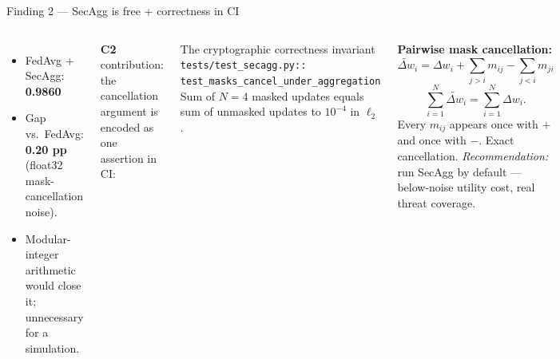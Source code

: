 \documentclass[10pt,aspectratio=169]{beamer}
\begin{document}
\begin{frame}[fragile]{Finding 2 --- SecAgg is free + correctness in CI}
  \begin{columns}[T]
    \begin{itemize}
      \item FedAvg + SecAgg: \textbf{0.9860}
      \item Gap vs.\ FedAvg: \textbf{0.20 pp} (float32 mask-cancellation noise).
      \item Modular-integer arithmetic would close it; unnecessary for a simulation.
    \end{itemize}
    \vspace{0.5em}
    \textbf{C2} contribution: the cancellation argument is encoded as one assertion in CI:
    \begin{block}{The cryptographic correctness invariant}
      \scriptsize
      \verb|tests/test_secagg.py::|\\
      \verb|test_masks_cancel_under_aggregation|\\[0.3em]
      Sum of $N=4$ masked updates equals sum of unmasked updates to $10^{-4}$ in $\ell_2$.
    \end{block}
    \textbf{Pairwise mask cancellation:}
    \[
      \tilde{\Delta w}_i = \Delta w_i + \!\!\sum_{j > i} m_{ij} - \!\!\sum_{j < i} m_{ji}
    \]
    \[
      \sum_{i=1}^{N} \tilde{\Delta w}_i = \sum_{i=1}^{N} \Delta w_i.
    \]
    Every $m_{ij}$ appears once with $+$ and once with $-$. Exact cancellation.
    \vspace{0.5em}
    \emph{Recommendation:} run SecAgg by default --- below-noise utility cost, real threat coverage.
  \end{columns}
\end{frame}
\end{document}
